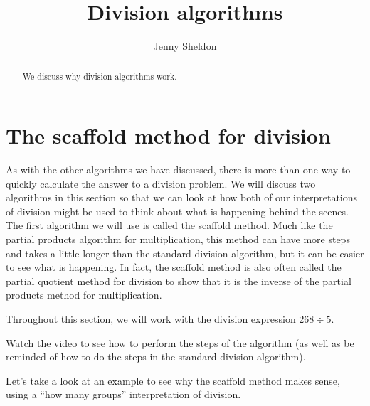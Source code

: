 \documentclass{ximera}
\title{Division algorithms}
\author{Jenny Sheldon}
\begin{document}
\begin{abstract}
We discuss why division algorithms work.
\end{abstract}
\maketitle





\section{The scaffold method for division}

As with the other algorithms we have discussed, there is more than one way to quickly calculate the answer to a division problem. We will discuss two algorithms in this section so that we can look at how both of our interpretations of division might be used to think about what is happening behind the scenes. The first algorithm we will use is called the scaffold method. Much like the partial products algorithm for multiplication, this method can have more steps and takes a little longer than the standard division algorithm, but it can be  easier to see what is happening. In fact, the scaffold method is also often called the partial quotient method for division to show that it is the inverse of the partial products method for multiplication.

Throughout this section, we will work with the division expression $268 \div 5$.

Watch the video to see how to perform the steps of the algorithm (as well as be reminded of how to do the steps in the standard division algorithm).


Let's take a look at an example to see why the scaffold method makes sense, using a ``how many groups'' interpretation of division.
\end{document}
